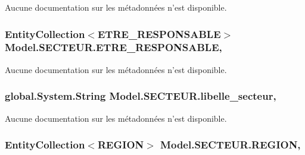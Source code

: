 Aucune documentation sur les métadonnées n'est disponible. 

\hypertarget{class_model_1_1_s_e_c_t_e_u_r_a6ae4e9f4e0e89e1fe68995194972a6db}{
\subsubsection[{E\-T\-R\-E\-\_\-\-R\-E\-S\-P\-O\-N\-S\-A\-B\-L\-E}]{\setlength{\rightskip}{0pt plus 5cm}Entity\-Collection$<${\bf E\-T\-R\-E\-\_\-\-R\-E\-S\-P\-O\-N\-S\-A\-B\-L\-E}$>$ Model.\-S\-E\-C\-T\-E\-U\-R.\-E\-T\-R\-E\-\_\-\-R\-E\-S\-P\-O\-N\-S\-A\-B\-L\-E\hspace{0.3cm}{\ttfamily [get]}, {\ttfamily [set]}}}\label{class_model_1_1_s_e_c_t_e_u_r_a6ae4e9f4e0e89e1fe68995194972a6db}


Aucune documentation sur les métadonnées n'est disponible. 

\hypertarget{class_model_1_1_s_e_c_t_e_u_r_acd43f9e6cd67fd6018645b7c944fcf40}{
\subsubsection[{libelle\-\_\-secteur}]{\setlength{\rightskip}{0pt plus 5cm}global.\-System.\-String Model.\-S\-E\-C\-T\-E\-U\-R.\-libelle\-\_\-secteur\hspace{0.3cm}{\ttfamily [get]}, {\ttfamily [set]}}}\label{class_model_1_1_s_e_c_t_e_u_r_acd43f9e6cd67fd6018645b7c944fcf40}


Aucune documentation sur les métadonnées n'est disponible. 

\hypertarget{class_model_1_1_s_e_c_t_e_u_r_a10eb57d7aa180eb2757990d77002b00e}{
\subsubsection[{R\-E\-G\-I\-O\-N}]{\setlength{\rightskip}{0pt plus 5cm}Entity\-Collection$<${\bf R\-E\-G\-I\-O\-N}$>$ Model.\-S\-E\-C\-T\-E\-U\-R.\-R\-E\-G\-I\-O\-N\hspace{0.3cm}{\ttfamily [get]}, {\ttfamily [set]}}}\label{class_model_1_1_s_e_c_t_e_u_r_a10eb57d7aa180eb2757990d77002b00e}


